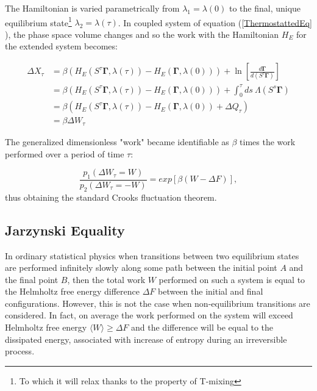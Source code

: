 \documentclass[a4paper,12pt]{article}
\begin{document}
The Hamiltonian is varied parametrically from $\lambda_1 =\lambda(0)$ to the final, unique equilibrium state\footnote{To which it will relax thanks to the property of T-mixing} $\lambda_2 = \lambda(\tau)$. In coupled system of equation (\ref{ThermostattedEq} ), the phase space volume changes and so the work with the Hamiltonian $H_E$ for the extended system becomes:

\begin{equation}
\begin{aligned}
  \Delta X_\tau &= \beta ( H_E(S^\tau \bm{\Gamma}, \lambda(\tau))-H_E(\bm{\Gamma},\lambda(0))) + \ln\left[\frac{d\bm{\Gamma}}{d(S^\tau \bm{\Gamma})}\right]\\
  &=\beta ( H_E(S^\tau \bm{\Gamma}, \lambda(\tau))-H_E(\bm{\Gamma},\lambda(0))) + \int_0^\tau ds\ \Lambda(S^s\bm{\Gamma})\\
  &=\beta ( H_E(S^\tau \bm{\Gamma}, \lambda(\tau))-H_E(\bm{\Gamma},\lambda(0)) +\Delta Q_\tau) \\
  &=\beta \Delta W_\tau
\end{aligned}
\end{equation}

The generalized dimensionless "work" became identifiable as $\beta$ times the work performed over a period of time $\tau$:

\begin{equation}
\label{CFT}
  \frac{p_1(\Delta W_\tau =W)}{p_2(\Delta W_\tau = -W)} = exp[\beta (W - \Delta F)],
\end{equation}
thus obtaining the standard Crooks fluctuation theorem.

\subsection{Jarzynski Equality}

In ordinary statistical physics when transitions between two equilibrium states are performed infinitely slowly along some path between the initial point $A$ and the final point $B$, then the total work $W$ performed on such a system is equal to the Helmholtz free energy difference $\Delta F$ between the initial and final configurations. However, this is not the case when non-equilibrium transitions are considered. In fact, on average the work performed on the system will exceed Helmholtz free energy $ \langle  W \rangle \geq \Delta F $ and the difference will be equal to the dissipated energy, associated with increase of entropy during an irreversible process.
\end{document}
